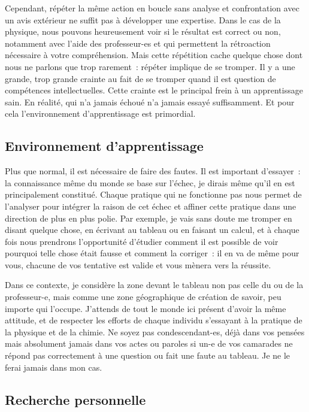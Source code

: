 Cependant, répéter la même action en boucle sans analyse et confrontation avec
un avis extérieur ne suffit pas à développer une expertise. Dans le cas de la
physique, nous pouvons heureusement voir si le résultat est correct ou non,
notamment avec l'aide des professeur-es et qui permettent la rétroaction
nécessaire à votre compréhension. Mais cette répétition cache quelque chose dont
nous ne parlons que trop rarement~: répéter implique de se tromper. Il y a une
grande, trop grande crainte au fait de se tromper quand il est question de
compétences intellectuelles. Cette crainte est le principal frein à un
apprentissage sain. En réalité, qui n'a jamais échoué n'a jamais essayé
suffisamment. Et pour cela l'environnement d'apprentissage est primordial.

\subsection{Environnement d'apprentissage}

Plus que normal, il est nécessaire de faire des fautes. Il est important
d'essayer~: la connaissance même du monde se base sur l'échec, je dirais même
qu'il en est principalement constitué. Chaque pratique qui ne fonctionne pas
nous permet de l'analyser pour intégrer la raison de cet échec et affiner cette
pratique dans une direction de plus en plus polie. Par exemple, je vais sans
doute me tromper en disant quelque chose, en écrivant au tableau ou en faisant
un calcul, et à chaque fois nous prendrons l'opportunité d'étudier comment il
est possible de voir pourquoi telle chose était fausse et comment la corriger~:
il en va de même pour vous, chacune de vos tentative est valide et vous mènera
vers la réussite.

Dans ce contexte, je considère la zone devant le tableau non pas celle du ou de
la professeur-e, mais comme une zone géographique de création de savoir, peu
importe qui l'occupe. J'attends de tout le monde ici présent d'avoir la même
attitude, et de respecter les efforts de chaque individu s'essayant à la
pratique de la physique et de la chimie. Ne soyez pas condescendant-es, déjà
dans vos pensées mais absolument jamais dans vos actes ou paroles si un-e de vos
camarades ne répond pas correctement à une question ou fait une faute au
tableau. Je ne le ferai jamais dans mon cas.

\subsection{Recherche personnelle}

